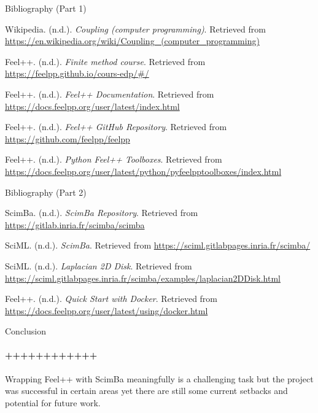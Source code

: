 \documentclass{beamer}
\begin{document}
\begin{frame}{Bibliography (Part 1)}
\begin{thebibliography}{14}

\setcounter{enumiv}{0}

Wikipedia. (n.d.). \textit{Coupling (computer programming)}. Retrieved from \url{https://en.wikipedia.org/wiki/Coupling_(computer_programming)}

Feel++. (n.d.). \textit{Finite method course}. Retrieved from \url{https://feelpp.github.io/cours-edp/#/}

Feel++. (n.d.). \textit{Feel++ Documentation}. Retrieved from \url{https://docs.feelpp.org/user/latest/index.html}

Feel++. (n.d.). \textit{Feel++ GitHub Repository}. Retrieved from \url{https://github.com/feelpp/feelpp}

Feel++. (n.d.). \textit{Python Feel++ Toolboxes}. Retrieved from \url{https://docs.feelpp.org/user/latest/python/pyfeelpptoolboxes/index.html}

\end{thebibliography}
\end{frame}

\begin{frame}{Bibliography (Part 2)}
\begin{thebibliography}{14}

\setcounter{enumiv}{5}

ScimBa. (n.d.). \textit{ScimBa Repository}. Retrieved from \url{https://gitlab.inria.fr/scimba/scimba}

SciML. (n.d.). \textit{ScimBa}. Retrieved from \url{https://sciml.gitlabpages.inria.fr/scimba/}


SciML. (n.d.). \textit{Laplacian 2D Disk}. Retrieved from \url{https://sciml.gitlabpages.inria.fr/scimba/examples/laplacian2DDisk.html}

Feel++. (n.d.). \textit{Quick Start with Docker}. Retrieved from \url{https://docs.feelpp.org/user/latest/using/docker.html}

\end{thebibliography}
\end{frame}

\begin{frame}{Conclusion}
\framesubtitle{++++++++++++}

Wrapping Feel++ with ScimBa meaningfully is a challenging task but the project was successful in certain areas yet there are still some current setbacks and potential for future work.
\end{frame}
\title{}

\backmatter
\end{document}
